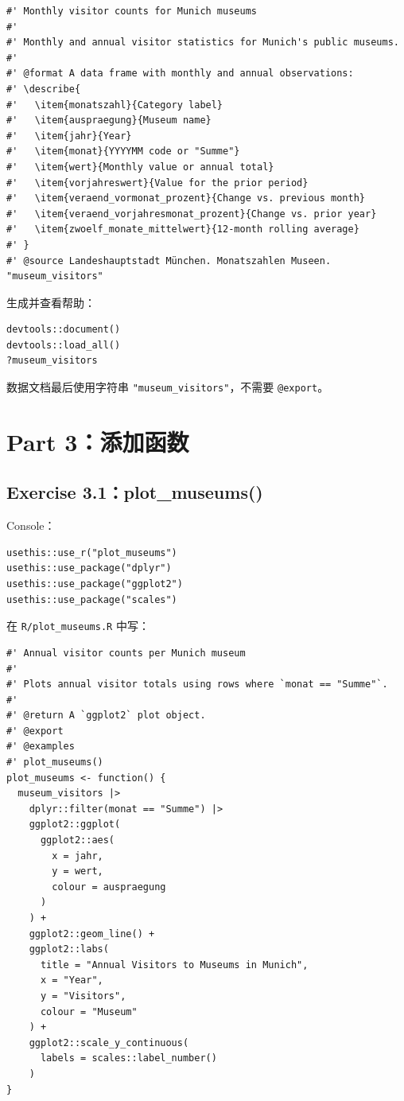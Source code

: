 \documentclass[11pt,a4paper]{ctexart}
\begin{document}
\begin{lstlisting}
#' Monthly visitor counts for Munich museums
#'
#' Monthly and annual visitor statistics for Munich's public museums.
#'
#' @format A data frame with monthly and annual observations:
#' \describe{
#'   \item{monatszahl}{Category label}
#'   \item{auspraegung}{Museum name}
#'   \item{jahr}{Year}
#'   \item{monat}{YYYYMM code or "Summe"}
#'   \item{wert}{Monthly value or annual total}
#'   \item{vorjahreswert}{Value for the prior period}
#'   \item{veraend_vormonat_prozent}{Change vs. previous month}
#'   \item{veraend_vorjahresmonat_prozent}{Change vs. prior year}
#'   \item{zwoelf_monate_mittelwert}{12-month rolling average}
#' }
#' @source Landeshauptstadt München. Monatszahlen Museen.
"museum_visitors"
\end{lstlisting}

生成并查看帮助：

\begin{lstlisting}
devtools::document()
devtools::load_all()
?museum_visitors
\end{lstlisting}

数据文档最后使用字符串 \texttt{"museum\_visitors"}，不需要 \texttt{@export}。

\section{Part 3：添加函数}

\subsection{Exercise 3.1：plot\_museums()}

Console：

\begin{lstlisting}
usethis::use_r("plot_museums")
usethis::use_package("dplyr")
usethis::use_package("ggplot2")
usethis::use_package("scales")
\end{lstlisting}

在 \texttt{R/plot\_museums.R} 中写：

\begin{lstlisting}
#' Annual visitor counts per Munich museum
#'
#' Plots annual visitor totals using rows where `monat == "Summe"`.
#'
#' @return A `ggplot2` plot object.
#' @export
#' @examples
#' plot_museums()
plot_museums <- function() {
  museum_visitors |>
    dplyr::filter(monat == "Summe") |>
    ggplot2::ggplot(
      ggplot2::aes(
        x = jahr,
        y = wert,
        colour = auspraegung
      )
    ) +
    ggplot2::geom_line() +
    ggplot2::labs(
      title = "Annual Visitors to Museums in Munich",
      x = "Year",
      y = "Visitors",
      colour = "Museum"
    ) +
    ggplot2::scale_y_continuous(
      labels = scales::label_number()
    )
}
\end{lstlisting}
\end{document}

